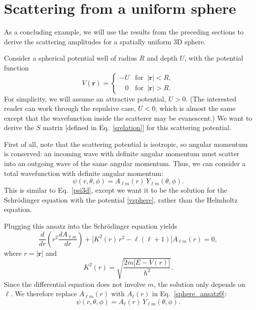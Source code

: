 \documentclass[pra,12pt]{revtex4-2}
\begin{document}
\section{Scattering from a uniform sphere}
\label{sec:sphere}

As a concluding example, we will use the results from the preceding
sections to derive the scattering amplitudes for a spatially uniform
3D sphere.

Consider a spherical potential well of radius $R$ and depth $U$, with
the potential function
\begin{equation}
  V(\mathbf{r}) = \begin{cases}-U &\mathrm{for}\;\; |\mathbf{r}| < R, \\
    \;\;\; 0 & \mathrm{for}\;\; |\mathbf{r}| > R.\end{cases}
  \label{vsphere}
\end{equation}
For simplicity, we will assume an attractive potential, $U > 0$.  (The
interested reader can work through the repulsive case, $U < 0$, which
is almost the same except that the wavefunction inside the scatterer
may be evanescent.)  We want to derive the $S$ matrix [defined in
  Eq.~\eqref{srelation}] for this scattering potential.

First of all, note that the scattering potential is isotropic, so
angular momentum is conserved: an incoming wave with definite angular
momentum must scatter into an outgoing wave of the same angular
momentum.  Thus, we can consider a total wavefunction with definite
angular momentum:
\begin{equation}
  \psi(r,\theta,\phi) = A_{\ell m}(r) \, Y_{\ell m}(\theta, \phi).
  \label{sphere_ansatz0}
\end{equation}
This is similar to Eq.~\eqref{psi3d}, except we want it to be the
solution for the Schr\"odinger equation with the potential
\eqref{vsphere}, rather than the Helmholtz equation.

Plugging this ansatz into the Schr\"odinger equation yields
\begin{equation}
  \frac{d}{dr}\left(r^2\frac{dA_{\ell m}}{dr}\right)
  + \Big[K^2(r)\, r^2 - \ell(\ell+1)\Big] A_{\ell m}(r) = 0,
  \label{sphericalschrod}
\end{equation}
where $r = |\mathbf{r}|$ and
\begin{equation}
  K^2(r) = \sqrt{\frac{2m\big[E-V(r)\big]}{\hbar^2}}.
\end{equation}
Since the differential equation does not involve $m$, the solution
only depends on $\ell$.  We therefore replace $A_{\ell m}(r)$ with
$A_\ell(r)$ in Eq.~\eqref{sphere_ansatz0}:
\begin{equation}
  \psi(r,\theta,\phi) = A_{\ell}(r) \, Y_{\ell m}(\theta, \phi).
\end{equation}
\end{document}

